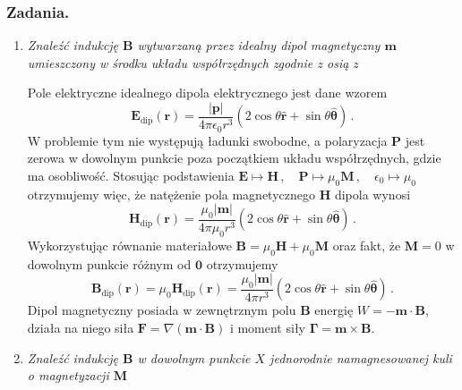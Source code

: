 \documentclass[../main.tex]{subfiles}
\begin{document}
\subsubsection*{Zadania.}
\begin{enumerate}
    \item \textit{Znaleźć indukcję \(\mathbf{B}\) wytwarzaną przez idealny dipol magnetyczny \(\mathbf{m}\) umieszczony w środku układu współrzędnych zgodnie z osią \(z\)}
    \medskip
    
    Pole elektryczne idealnego dipola elektrycznego jest dane wzorem
    \begin{equation*}
        \mathbf{E}_\text{dip}(\mathbf{r})=\frac{|\mathbf{p}|}{4\pi\epsilon_0r^3}(2\cos\theta\mathbf{\hat{r}}+\sin\theta\boldsymbol{\hat{\theta}})\,.
    \end{equation*}
    W problemie tym nie występują ładunki swobodne, a polaryzacja \(\mathbf{P}\) jest zerowa w dowolnym punkcie poza początkiem układu współrzędnych, gdzie ma osobliwość. Stosując podstawienia \(\mathbf{E}\mapsto\mathbf{H}\,,\quad \mathbf{P}\mapsto\mu_0\mathbf{M}\,,\quad\epsilon_0\mapsto\mu_0\) otrzymujemy więc, że natężenie pola magnetycznego \(\mathbf{H}\) dipola wynosi
    \begin{equation*}
        \mathbf{H}_\text{dip}(\mathbf{r})=\frac{\mu_0|\mathbf{m}|}{4\pi\mu_0r^3}(2\cos\theta\mathbf{\hat{r}}+\sin\theta\boldsymbol{\hat{\theta}})\,.
    \end{equation*}
    Wykorzystując równanie materiałowe \(\mathbf{B}=\mu_0\mathbf{H}+\mu_0\mathbf{M}\) oraz fakt, że \(\mathbf{M}=0\) w dowolnym punkcie różnym od \(\mathbf{0}\) otrzymujemy
    \begin{equation*}
        \mathbf{B}_\text{dip}(\mathbf{r})=\mu_0\mathbf{H}_\text{dip}(\mathbf{r})=\frac{\mu_0|\mathbf{m}|}{4\pi r^3}(2\cos\theta\mathbf{\hat{r}}+\sin\theta\boldsymbol{\hat{\theta}})\,.
    \end{equation*}
    Dipol magnetyczny posiada w zewnętrznym polu \(\mathbf{B}\) energię \(W=-\mathbf{m}\cdot\mathbf{B}\), działa na niego siła \(\mathbf{F}=\nabla(\mathbf{m}\cdot\mathbf{B})\) i moment siły \(\boldsymbol{\Gamma}=\mathbf{m}\times\mathbf{B}\).
    \item \textit{Znaleźć indukcję \(\mathbf{B}\) w dowolnym punkcie \(X\) jednorodnie namagnesowanej kuli o magnetyzacji \(\mathbf{M}\)}
    \medskip
    

\end{enumerate}
\end{document}
